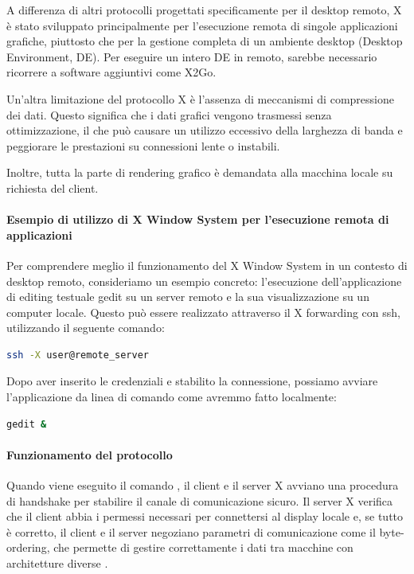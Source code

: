 \documentclass[12pt,a4paper,openright,twoside]{book}
\begin{document}
A differenza di altri protocolli progettati specificamente per il desktop remoto, X è stato sviluppato principalmente per l'esecuzione remota di singole applicazioni grafiche, piuttosto che per la gestione completa di un ambiente desktop (Desktop Environment, DE). Per eseguire un intero DE in remoto, sarebbe necessario ricorrere a software aggiuntivi come X2Go.

Un'altra limitazione del protocollo X è l'assenza di meccanismi di compressione dei dati. Questo significa che i dati grafici vengono trasmessi senza ottimizzazione, il che può causare un utilizzo eccessivo della larghezza di banda e peggiorare le prestazioni su connessioni lente o instabili.

Inoltre, tutta la parte di rendering grafico è demandata alla macchina locale su richiesta del client.

\paragraph{Esempio di utilizzo di X Window System per l'esecuzione remota di applicazioni}

Per comprendere meglio il funzionamento del X Window System in un contesto di desktop remoto, consideriamo un esempio concreto: l'esecuzione dell'applicazione di editing testuale gedit su un server remoto e la sua visualizzazione su un computer locale. Questo può essere realizzato attraverso il X forwarding con ssh, utilizzando il seguente comando:

\begin{lstlisting}[caption={Connessione remota con X forwarding}, label={lst:ssh-x}, language=bash]
ssh -X user@remote_server
\end{lstlisting}

Dopo aver inserito le credenziali e stabilito la connessione, possiamo avviare l'applicazione da linea di comando come avremmo fatto localmente:

\begin{lstlisting}[caption={Esecuzione di gedit su server remoto}, label={lst:gedit}, language=bash]
gedit &
\end{lstlisting}

\paragraph{Funzionamento del protocollo}

Quando viene eseguito il comando , il client e il server X avviano una procedura di handshake per stabilire il canale di comunicazione sicuro. Il server X verifica che il client abbia i permessi necessari per connettersi al display locale e, se tutto è corretto, il client e il server negoziano parametri di comunicazione come il byte-ordering, che permette di gestire correttamente i dati tra macchine con architetture diverse \cite{xDevGuide}.
\end{document}

